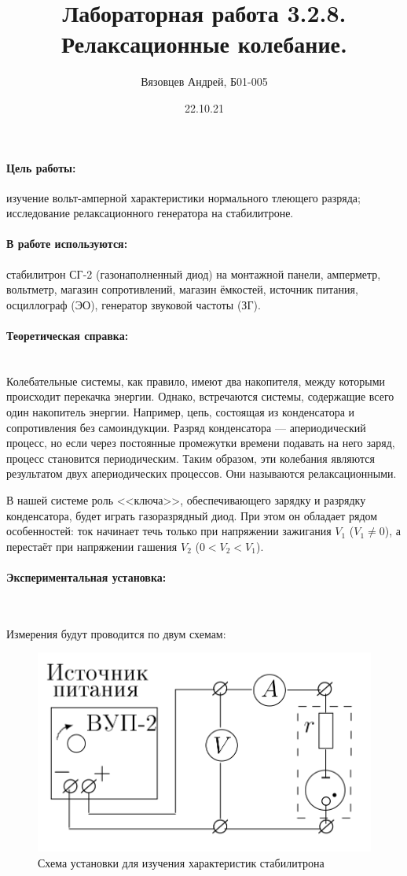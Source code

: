 \documentclass[a4paper, 12pt]{article}
\author{Вязовцев Андрей, Б01-005}
\date{22.10.21}
\title{Лабораторная работа 3.2.8. Релаксационные колебание.}
\newcommand{\parag}[1]{\paragraph*{#1:}}
\begin{document}
\maketitle

\parag {Цель работы} изучение вольт-амперной характеристики нормального тлеющего разряда; исследование релаксационного генератора на стабилитроне.

\parag {В работе используются} стабилитрон СГ-2 (газонаполненный диод) на монтажной панели, амперметр, вольтметр, магазин сопротивлений, магазин ёмкостей, источник питания, осциллограф (ЭО), генератор звуковой частоты (ЗГ).

\parag {Теоретическая справка} ~\\

Колебательные системы, как правило, имеют два накопителя, между которыми происходит перекачка энергии. Однако, встречаются системы, содержащие всего один накопитель энергии. Например, цепь, состоящая из конденсатора и сопротивления без самоиндукции. Разряд конденсатора --- апериодический процесс, но если через постоянные промежутки времени подавать на него заряд, процесс становится периодическим. Таким образом, эти колебания являются результатом двух апериодических процессов. Они называются релаксационными.

В нашей системе роль <<ключа>>, обеспечивающего зарядку и разрядку конденсатора, будет играть газоразрядный диод. При этом он обладает рядом особенностей: ток начинает течь только при напряжении зажигания $V_1$ ($V_1 \neq 0$), а перестаёт при напряжении гашения $V_2$ ($0 < V_2 < V_1$).

\parag {Экспериментальная установка} ~

Измерения будут проводится по двум схемам:

\begin{figure}[!h]
    \includegraphics[scale = 0.2]{Workplace1}
    \centering
    \caption{Схема установки для изучения характеристик стабилитрона}
    \label{shem1}
\end{figure}
\end{document}
